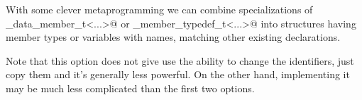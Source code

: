 With some clever metaprogramming we can combine specializations
of \verb@named_data_member_t<...>@ or \verb@named_member_typedef_t<...>@
into structures having member types or variables with names, matching other
existing declarations.

Note that this option does not give use the ability to change the identifiers,
just copy them and it's generally less powerful.
On the other hand, implementing it may be much less complicated
than the first two options.

